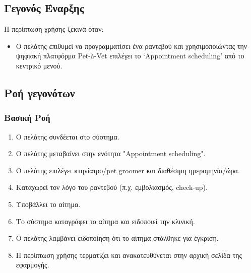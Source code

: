 \documentclass[12pt,a4paper,twoside]{book}
\begin{document}
\subsection{Γεγονός Έναρξης}
Η περίπτωση χρήσης ξεκινά όταν:
\begin{itemize}
  \item Ο πελάτης επιθυμεί να προγραμματίσει ένα ραντεβού και χρησιμοποιώντας την ψηφιακή πλατφόρμα  Pet-à-Vet επιλέγει το ‘Appointment scheduling’ από το κεντρικό μενού. %
\end{itemize}

\subsection{Ροή γεγονότων}

\subsubsection{Βασική Ροή}
\begin{enumerate}
  \item Ο πελάτης συνδέεται στο σύστημα. %
  \item Ο πελάτης μεταβαίνει στην ενότητα "Appointment scheduling". %
  \item Ο πελάτης επιλέγει κτηνίατρο/pet groomer και διαθέσιμη ημερομηνία/ώρα. %
  \item Καταχωρεί τον λόγο του ραντεβού (π.χ. εμβολιασμός, check-up). %
  \item Υποβάλλει το αίτημα.  %
  \item Το σύστημα καταγράφει το αίτημα και ειδοποιεί την κλινική. %
  \item Ο πελάτης λαμβάνει ειδοποίηση ότι το αίτημα στάλθηκε για έγκριση. %
  \item Η περίπτωση χρήσης τερματίζει και ανακατευθύνεται στην αρχική σελίδα της εφαρμογής. %
\end{enumerate}
\end{document}
